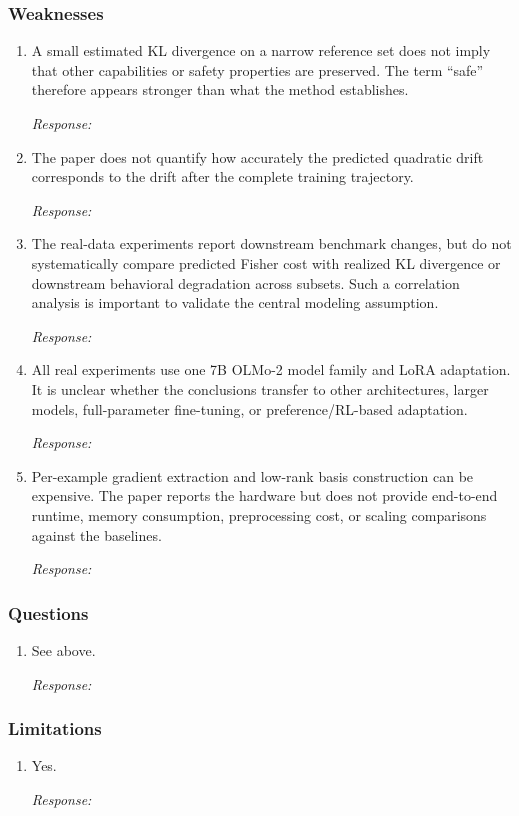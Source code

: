 \documentclass{article}
\newcommand{\response}[1][Response]{%
  \begin{answerbox}\textit{\small #1:}\end{answerbox}
}
\begin{document}
\subsubsection*{Weaknesses}
\begin{enumerate}
    \item A small estimated KL divergence on a narrow reference set does not imply that other capabilities or safety properties are preserved. The term ``safe'' therefore appears stronger than what the method establishes.
    \response
    \item The paper does not quantify how accurately the predicted quadratic drift corresponds to the drift after the complete training trajectory.
    \response
    \item The real-data experiments report downstream benchmark changes, but do not systematically compare predicted Fisher cost with realized KL divergence or downstream behavioral degradation across subsets. Such a correlation analysis is important to validate the central modeling assumption.
    \response
    \item All real experiments use one 7B OLMo-2 model family and LoRA adaptation. It is unclear whether the conclusions transfer to other architectures, larger models, full-parameter fine-tuning, or preference/RL-based adaptation.
    \response
    \item Per-example gradient extraction and low-rank basis construction can be expensive. The paper reports the hardware but does not provide end-to-end runtime, memory consumption, preprocessing cost, or scaling comparisons against the baselines.
    \response
\end{enumerate}

\subsubsection*{Questions}
\begin{enumerate}
    \item See above.
    \response
\end{enumerate}

\subsubsection*{Limitations}
\begin{enumerate}
    \item Yes.
    \response
\end{enumerate}
\end{document}
